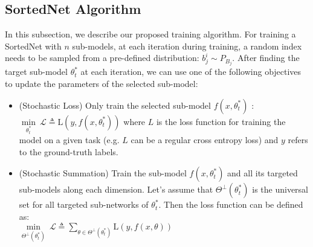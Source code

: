 \documentclass[letterpaper]{article} %
\begin{document}
\subsection{SortedNet Algorithm}

In this subsection, we describe our proposed training algorithm. For training a SortedNet with $n$ sub-models, at each iteration during training, a random index needs to be sampled from a pre-defined distribution: $b_j^i \sim P_{B_j}$. 
After finding the target sub-model $\theta_t^*$ at each iteration, we can use one of the following objectives to update the parameters of the selected sub-model: 


\begin{itemize}
    \item (Stochastic Loss) Only train the selected sub-model $f(x,\theta_t^*)$ : \\$\underset{\theta_t^*}{\min} ~\mathcal{L} \triangleq \text{L}(y, f(x,\theta_t^*))$
    where $L$ is the loss function for training the model on a given task (e.g. $L$ can be a regular cross entropy loss) and $y$ refers to the ground-truth labels.
    \item (Stochastic Summation) Train the sub-model $f(x,\theta_t^*)$ and all its targeted sub-models along each dimension. Let's assume that $\Theta^\perp (\theta_t^*)$ is the universal set for all targeted sub-networks of $\theta_t^*$. Then the loss function can be defined as:  \\
    $\underset{\Theta^\perp (\theta_t^*)}{\min} ~\mathcal{L} \triangleq \sum_{\theta \in \Theta^\perp (\theta_t^*)} \text{L}(y, f(x,\theta) )$
\end{itemize}
\end{document}
